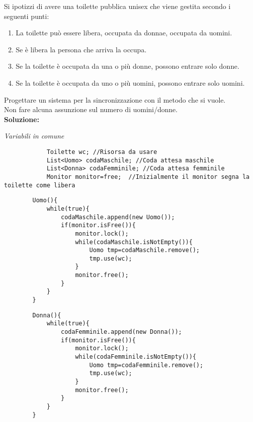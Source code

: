 \documentclass{article}
\begin{document}
    Si ipotizzi di avere una toilette pubblica unisex che viene gestita secondo i seguenti punti:\\
    \begin{enumerate}
        \item La toilette può essere libera, occupata da donnae, occupata da uomini.
        \item Se è libera la persona che arriva la occupa.
        \item Se la toilette è occupata da una o più donne, possono entrare solo donne.
        \item Se la toilette è occupata da uno o più uomini, possono entrare solo uomini.
    \end{enumerate}
    Progettare un sistema per la sincronizzazione con il metodo che si vuole.\\
    Non fare alcuna assunzione sul numero di uomini/donne.\\
    \textbf{Soluzione:}
    \begin{center}
        \emph{Variabili in comune}
        \begin{lstlisting}
            Toilette wc; //Risorsa da usare
            List<Uomo> codaMaschile; //Coda attesa maschile
            List<Donna> codaFemminile; //Coda attesa femminile
            Monitor monitor=free;  //Inizialmente il monitor segna la toilette come libera
        \end{lstlisting}
    \end{center}
    \begin{lstlisting}
        Uomo(){
            while(true){
                codaMaschile.append(new Uomo());
                if(monitor.isFree()){
                    monitor.lock();
                    while(codaMaschile.isNotEmpty()){
                        Uomo tmp=codaMaschile.remove();
                        tmp.use(wc);
                    }
                    monitor.free();
                }
            }
        }
    \end{lstlisting}
    \begin{lstlisting}
        Donna(){
            while(true){
                codaFemminile.append(new Donna());
                if(monitor.isFree()){
                    monitor.lock();
                    while(codaFemminile.isNotEmpty()){
                        Uomo tmp=codaFemminile.remove();
                        tmp.use(wc);
                    }
                    monitor.free();
                }
            }
        }
    \end{lstlisting}
\end{document}
